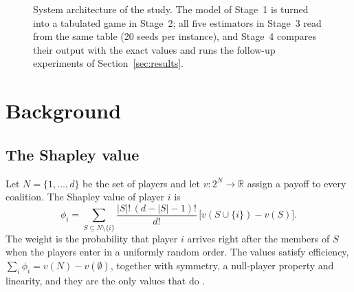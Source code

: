 \documentclass[conference]{IEEEtran}
\begin{document}
\begin{figure}[t]
{}
\caption{System architecture of the study. The model of Stage~1 is turned into a tabulated game in Stage~2; all five estimators in Stage~3 read from the same table (20 seeds per instance), and Stage~4 compares their output with the exact values and runs the follow-up experiments of Section~\ref{sec:results}.}
\label{fig:arch}
\end{figure}

\section{Background}

\subsection{The Shapley value}
Let $N=\{1,\dots,d\}$ be the set of players and let $v:2^N\to\mathbb{R}$ assign a payoff to every coalition. The Shapley value of player $i$ is
\begin{equation}
\phi_i = \sum_{S\subseteq N\setminus\{i\}} \frac{|S|!\,(d-|S|-1)!}{d!}\,\bigl[v(S\cup\{i\})-v(S)\bigr].
\label{eq:shapley}
\end{equation}
The weight is the probability that player $i$ arrives right after the members of $S$ when the players enter in a uniformly random order. The values satisfy efficiency, $\sum_i\phi_i=v(N)-v(\emptyset)$, together with symmetry, a null-player property and linearity, and they are the only values that do \cite{shapley1953}.
\end{document}
